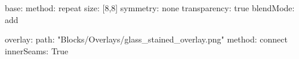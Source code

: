 base:
  method: repeat
  size: [8,8]
  symmetry: none
  transparency: true
blendMode: add
  
overlay:
  path: "Blocks/Overlays/glass_stained_overlay.png"
  method: connect
  innerSeams: True
